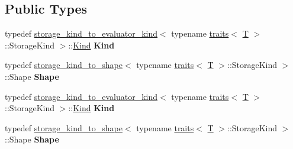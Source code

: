 \subsection*{Public Types}
\begin{DoxyCompactItemize}
\item 
\mbox{\label{struct_eigen_1_1internal_1_1evaluator__traits__base_aa0f8c3c1e421a4806aa19a76bc4574c7}} 
typedef \hyperlink{struct_eigen_1_1internal_1_1storage__kind__to__evaluator__kind}{storage\+\_\+kind\+\_\+to\+\_\+evaluator\+\_\+kind}$<$ typename \hyperlink{struct_eigen_1_1internal_1_1traits}{traits}$<$ \hyperlink{group___sparse_core___module}{T} $>$\+::Storage\+Kind $>$\+::\hyperlink{struct_eigen_1_1internal_1_1_index_based}{Kind} {\bfseries Kind}
\item 
\mbox{\label{struct_eigen_1_1internal_1_1evaluator__traits__base_aa972f428fa0642aadd6c9c8c3cf29994}} 
typedef \hyperlink{struct_eigen_1_1internal_1_1storage__kind__to__shape}{storage\+\_\+kind\+\_\+to\+\_\+shape}$<$ typename \hyperlink{struct_eigen_1_1internal_1_1traits}{traits}$<$ \hyperlink{group___sparse_core___module}{T} $>$\+::Storage\+Kind $>$\+::Shape {\bfseries Shape}
\item 
\mbox{\label{struct_eigen_1_1internal_1_1evaluator__traits__base_aa0f8c3c1e421a4806aa19a76bc4574c7}} 
typedef \hyperlink{struct_eigen_1_1internal_1_1storage__kind__to__evaluator__kind}{storage\+\_\+kind\+\_\+to\+\_\+evaluator\+\_\+kind}$<$ typename \hyperlink{struct_eigen_1_1internal_1_1traits}{traits}$<$ \hyperlink{group___sparse_core___module}{T} $>$\+::Storage\+Kind $>$\+::\hyperlink{struct_eigen_1_1internal_1_1_index_based}{Kind} {\bfseries Kind}
\item 
\mbox{\label{struct_eigen_1_1internal_1_1evaluator__traits__base_aa972f428fa0642aadd6c9c8c3cf29994}} 
typedef \hyperlink{struct_eigen_1_1internal_1_1storage__kind__to__shape}{storage\+\_\+kind\+\_\+to\+\_\+shape}$<$ typename \hyperlink{struct_eigen_1_1internal_1_1traits}{traits}$<$ \hyperlink{group___sparse_core___module}{T} $>$\+::Storage\+Kind $>$\+::Shape {\bfseries Shape}
\end{DoxyCompactItemize}


